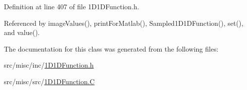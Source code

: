 Definition at line 407 of file 1\-D1\-D\-Function.\-h.



Referenced by image\-Values(), print\-For\-Matlab(), Sampled1\-D1\-D\-Function(), set(), and value().



The documentation for this class was generated from the following files\-:\begin{DoxyCompactItemize}
\item 
src/misc/inc/\hyperlink{1_d1_d_function_8h}{1\-D1\-D\-Function.\-h}\item 
src/misc/src/\hyperlink{1_d1_d_function_8_c}{1\-D1\-D\-Function.\-C}\end{DoxyCompactItemize}
